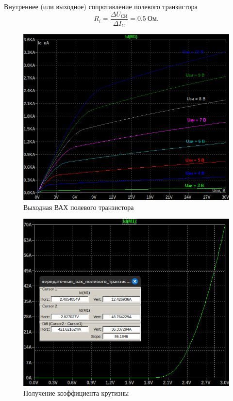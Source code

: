 Внутреннее (или выходное) сопротивление полевого
транзистора
\begin{equation*}
    R_i=\frac{\Delta U_\text{СИ}}{\Delta I_C}=0.5\ \text{Ом}.
\end{equation*}


\begin{figure}[H]
    \centering
    \includegraphics[width=0.8\linewidth]{figs/task_2_выход_вах.png}
    \caption{Выходная ВАХ полевого транзистора}
    \label{fig:выход_вах}
\end{figure}

\begin{figure}[H]
    \centering
    \includegraphics[width=0.8\linewidth]{figs/получение_S.png}
    \caption{Получение коэффициента крутизны}
    \label{fig:коэффициент_крутизны}
\end{figure}

